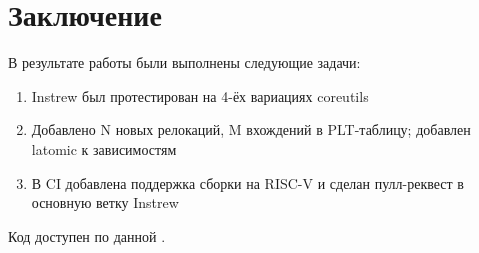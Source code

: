 
\section*{Заключение}
В результате работы были выполнены следующие задачи:
\vspace{8pt}
\begin{enumerate}
    	\item Instrew был протестирован на 4-ёх вариациях coreutils
		\item Добавлено N новых релокаций, M вхождений в PLT-таблицу; добавлен latomic к зависимостям
		\item В CI добавлена поддержка сборки на RISC-V и сделан пулл-реквест в основную ветку Instrew
\end{enumerate}
Код доступен по данной \href{https://github.com/aengelke/instrew/compare/master...mikhaylovilya:instrew:host-riscv64}{\color{blue}{ссылке}}.




